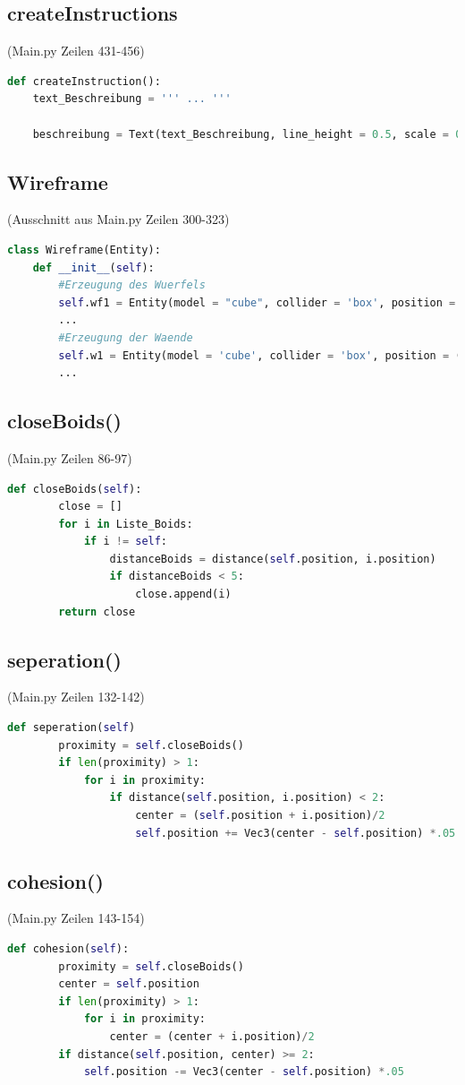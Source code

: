 \documentclass[a4paper, hidelinks, 12pt]{article}
\begin{document}
\subsection{createInstructions}(Main.py Zeilen 431-456)\label{CodeCreateInstructions}
\begin{lstlisting}[style=mystyle, language=Python]
	def createInstruction():
	text_Beschreibung = ''' ... '''
	
	beschreibung = Text(text_Beschreibung, line_height = 0.5, scale = 0.7, x = -.8, y = -.12, color = color.white)
\end{lstlisting}
\subsection{Wireframe}(Ausschnitt aus Main.py Zeilen 300-323)\label{CodeRaum}

\begin{lstlisting}[style=mystyle, language=Python]
class Wireframe(Entity):
	def __init__(self):
		#Erzeugung des Wuerfels
		self.wf1 = Entity(model = "cube", collider = 'box', position = (0, -51, -51), scale_x = 102)
		...
		#Erzeugung der Waende
		self.w1 = Entity(model = 'cube', collider = 'box', position = (0,0,-52),scale=(110,110,0), color = color.red, alpha = 0)
		...
\end{lstlisting}
\subsection{closeBoids()}(Main.py Zeilen 86-97)\label{CodecloseBoids}
\begin{lstlisting}[style=mystyle, language=Python]
	def closeBoids(self):
		close = []
		for i in Liste_Boids:
			if i != self:
				distanceBoids = distance(self.position, i.position)
				if distanceBoids < 5:
					close.append(i)
		return close
\end{lstlisting}
\subsection{seperation()} (Main.py Zeilen 132-142)\label{Codeseperation}
\begin{lstlisting}[style=mystyle, language=Python]
	def seperation(self)
		proximity = self.closeBoids()
		if len(proximity) > 1:
			for i in proximity:
				if distance(self.position, i.position) < 2:
					center = (self.position + i.position)/2
					self.position += Vec3(center - self.position) *.05
\end{lstlisting}
\subsection{cohesion()}(Main.py Zeilen 143-154)\label{Codecohesion}
\begin{lstlisting}[style=mystyle, language=Python]
	def cohesion(self):
		proximity = self.closeBoids()
		center = self.position
		if len(proximity) > 1:
			for i in proximity:
				center = (center + i.position)/2
		if distance(self.position, center) >= 2:
			self.position -= Vec3(center - self.position) *.05
\end{lstlisting}
\end{document}
